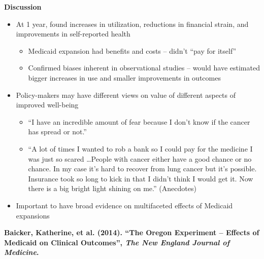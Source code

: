 \documentclass[notes=show]{beamer}
\begin{document}
\begin{frame}[plain]
	\begin{center}
	\textbf{Discussion}
	\end{center}
	
	\begin{itemize}
	\item At 1 year, found increases in utilization, reductions in financial strain, and improvements in self-reported health	
		\begin{itemize}
		\item Medicaid expansion had benefits and costs -- didn't ``pay for itself''
		\item Confirmed biases inherent in observational studies -- would have estimated bigger increases in use and smaller improvements in outcomes
		\end{itemize}
	\item Policy-makers may have different views on value of different aspects of improved well-being
		\begin{itemize}
		\item ``I have an incredible amount of fear because I don't know if the cancer has spread or not.''
		\item ``A lot of times I wanted to rob a bank so I could pay for the medicine I was just so scared \dots People with cancer either have a good chance or no chance.  In my case it's hard to recover from lung cancer but it's possible.  Insurance took so long to kick in that I didn't think I would get it.  Now there is a big bright light shining on me.'' (Anecdotes)
		\end{itemize}
	\item Important to have broad evidence on multifaceted effects of Medicaid expansions
	\end{itemize}
\end{frame}

\begin{frame}[plain]
	\begin{center}
	\textbf{Baicker, Katherine, et al. (2014). ``The Oregon Experiment -- Effects of Medicaid on Clinical Outcomes'', \emph{The New England Journal of Medicine}.}
	\end{center}
\end{frame}
\end{document}
